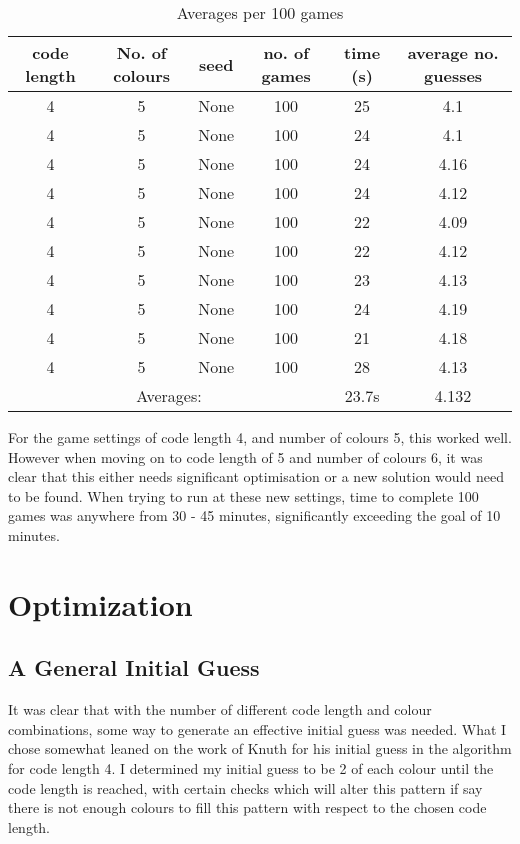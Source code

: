 \documentclass[12pt]{article}
\begin{document}
\begin{table}[htbp]
\centering
\begin{tabular}{|c|c|c|c|c|c|}
\hline
code length & No. of colours & seed & no. of games & time (s) & average no. guesses\\\hline
4 & 5 & None & 100 & 25 & 4.1\\
4 & 5 & None & 100 & 24 & 4.1\\
4 & 5 & None & 100 & 24 & 4.16\\
4 & 5 & None & 100 & 24 & 4.12\\
4 & 5 & None & 100 & 22 & 4.09\\
4 & 5 & None & 100 & 22 & 4.12\\
4 & 5 & None & 100 & 23 & 4.13\\
4 & 5 & None & 100 & 24 & 4.19\\
4 & 5 & None & 100 & 21 & 4.18\\
4 & 5 & None & 100 & 28 & 4.13\\
\hline
\multicolumn{4}{|c|}{Averages: } & 23.7s & 4.132\\
\hline
\end{tabular}
\caption{\label{tab:results1}Averages per 100 games}
\end{table}

For the game settings of code length 4, and number of colours 5, this worked well. However when moving on to code length of 5 and number of colours 6, it was clear that this either needs significant optimisation or a new solution would need to be found. When trying to run at these new settings, time to complete 100 games was anywhere from 30 - 45 minutes, significantly exceeding the goal of 10 minutes.

\section{Optimization}
\subsection{A General Initial Guess}
It was clear that with the number of different code length and colour combinations, some way to generate an effective initial guess was needed. What I chose somewhat leaned on the work of Knuth for his initial guess in the algorithm for code length 4. I determined my initial guess to be 2 of each colour until the code length is reached, with certain checks which will alter this pattern if say there is not enough colours to fill this pattern with respect to the chosen code length.
\end{document}
